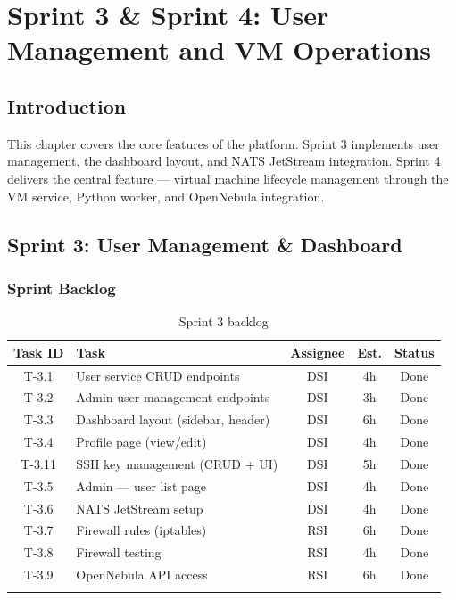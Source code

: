\chapter{Sprint 3 \& Sprint 4: User Management and VM Operations}

\section{Introduction}

This chapter covers the core features of the platform. Sprint 3 implements user management, the dashboard layout, and NATS JetStream integration. Sprint 4 delivers the central feature — virtual machine lifecycle management through the VM service, Python worker, and OpenNebula integration.

\section{Sprint 3: User Management \& Dashboard}


\subsection{Sprint Backlog}

\begin{longtable}{|c|p{5cm}|c|c|c|}
\hline
\rowcolor{blue!15}
\textbf{Task ID} & \textbf{Task} & \textbf{Assignee} & \textbf{Est.} & \textbf{Status} \\
\hline
\endhead
T-3.1 & User service CRUD endpoints & DSI & 4h & Done \\
\hline
T-3.2 & Admin user management endpoints & DSI & 3h & Done \\
\hline
T-3.3 & Dashboard layout (sidebar, header) & DSI & 6h & Done \\
\hline
T-3.4 & Profile page (view/edit) & DSI & 4h & Done \\
\hline
T-3.11 & SSH key management (CRUD + UI) & DSI & 5h & Done \\
\hline
T-3.5 & Admin — user list page & DSI & 4h & Done \\
\hline
T-3.6 & NATS JetStream setup & DSI & 4h & Done \\
\hline
T-3.7 & Firewall rules (iptables) & RSI & 6h & Done \\
\hline
T-3.8 & Firewall testing & RSI & 4h & Done \\
\hline
T-3.9 & OpenNebula API access & RSI & 6h & Done \\
\hline
\caption{Sprint 3 backlog}
\label{tab:sprint3-backlog}
\end{longtable}

